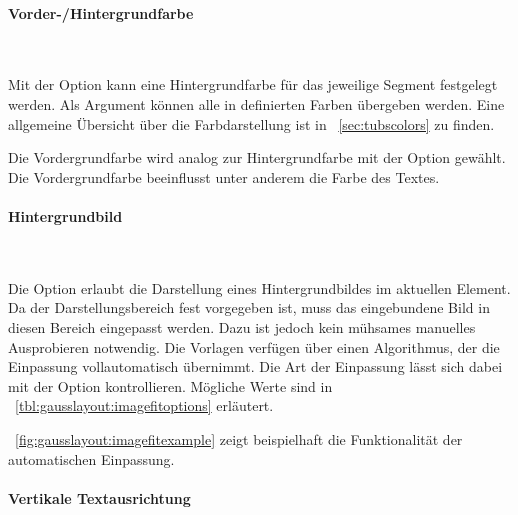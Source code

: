 \paragraph{Vorder-/Hintergrundfarbe}\hfill

\begin{Declaration}
  \\
\end{Declaration}

Mit der Option  kann eine Hintergrundfarbe für das
jeweilige Segment festgelegt werden. Als Argument können alle in \tubslatex
definierten Farben übergeben werden.
Eine allgemeine Übersicht über die Farbdarstellung ist in
\chaptername~\ref{sec:tubscolors} zu finden.

Die Vordergrundfarbe wird analog zur Hintergrundfarbe mit der
Option  gewählt.
Die Vordergrundfarbe beeinflusst unter anderem die Farbe des Textes.


\paragraph{Hintergrundbild}\hfill

\begin{Declaration}
  \\
\end{Declaration}

Die Option  erlaubt die Darstellung
eines Hintergrundbildes im aktuellen Element.
Da der Darstellungsbereich fest vorgegeben ist, muss das eingebundene Bild
in diesen Bereich eingepasst werden.
Dazu ist jedoch kein mühsames manuelles Ausprobieren notwendig.
Die Vorlagen verfügen über einen Algorithmus, der die Einpassung vollautomatisch
übernimmt.
Die Art der Einpassung lässt sich dabei mit der Option  kontrollieren.
%
Mögliche Werte sind in \tablename~\ref{tbl:gausslayout:imagefitoptions} erläutert.

\figurename~\ref{fig:gausslayout:imagefitexample} zeigt beispielhaft die Funktionalität
der automatischen Einpassung.


\paragraph{Vertikale Textausrichtung}\hfill

\begin{Declaration}
  \\
  \\
\end{Declaration}

